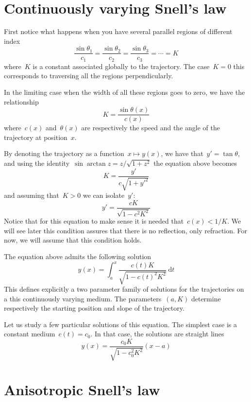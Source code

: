 \section{Continuously varying Snell's law}

First notice what happens when you have several parallel regions of different
index
$$
\frac{\sin\theta_1}{c_1}
=
\frac{\sin\theta_2}{c_2}
=
\frac{\sin\theta_3}{c_3}
=
\cdots
= K
$$
where~$K$ is a constant associated globally to the trajectory.  The
case~$K=0$ this corresponds to traversing all the regions perpendicularly.


In the limiting case when the width of all these regions goes to zero, we
have the relationship
\[
	K = \frac{\sin\theta(x)}{c(x)}
\]
where~$c(x)$ and~$\theta(x)$ are respectively the speed and the angle of the
trajectory at position~$x$.


By denoting the trajectory as a function~$x\mapsto y(x)$, we have
that~$y'=\tan\theta$, and using the identity~$\sin\arctan z=z/\sqrt{1+z^2}$
the equation above becomes
\[
	K=\frac{y'}{c\sqrt{1+y'^2}}
\]
and assuming that~$K>0$ we can isolate~$y'$:
\[
	y'=\frac{cK}{\sqrt{1-c^2K^2}}
\]
Notice that for this equation to make sense it is needed that~$c(x)<1/K$.  We
will see later this condition assures that there is no reflection, only
refraction.  For now, we will assume that this condition holds.

The equation above admits the following solution
\[
	y(x)=\int_a^x\frac{c(t)K}{\sqrt{1-c(t)^2K^2}}\ \mathrm{d} t
\]
This defines explicitly a two parameter family of solutions for the
trajectories on a this continuously varying medium.  The parameters~$(a,K)$
determine respectively the starting position and slope of the trajectory.

Let us study a few particular solutions of this equation.  The simplest case
is a constant medium~$c(t)=c_0$.  In that case, the solutions are straight
lines
\[
	y(x)=\frac{c_0K}{\sqrt{1-c_0^2K^2}}\left(x-a\right)
\]



\section{Anisotropic Snell's law}

